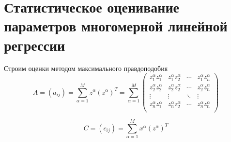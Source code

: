 \documentclass[a4paper,12pt]{report}
\begin{document}
    \section{Статистическое оценивание параметров многомерной линейной регрессии}

    Строим оценки методом максимального правдоподобия
    \[
        A = (a_{ij}) = \sum_{\alpha = 1}^M z^\alpha (z^\alpha)^T = \sum_{\alpha = 1 }^M
        \begin{pmatrix}
            z_{1}^\alpha z_{1}^\alpha & z_{1}^\alpha z_{2}^\alpha & \cdots & z_{1}^\alpha z_{n}^\alpha\\
            z_{2}^\alpha z_{2}^\alpha & z_{2}^\alpha z_{2}^\alpha & \cdots & z_{2}^\alpha z_{n}^\alpha\\
            \vdots  & \vdots  & \ddots & \vdots  \\
            z_{n}^\alpha z_{1}^\alpha & z_{n}^\alpha z_{2}^\alpha & \cdots & z_{n}^\alpha z_{n}^\alpha\\
 \end{pmatrix}
    \]

    \[ C = (c_{ij}) = \sum_{\alpha = 1}^M x^\alpha (z^\alpha)^T \]
\end{document}
